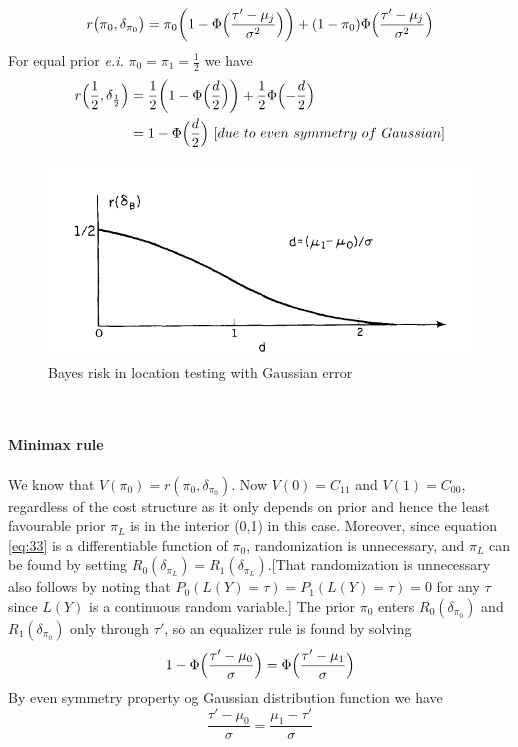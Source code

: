 \documentclass[a4paper,english,12pt]{article}
\begin{document}
\begin{exmp}
\begin{equation}
r\bigl(\pi_0,\delta_{\pi_{0}}\bigr)=\pi_0\biggl(1-\Phi\Bigl(\frac{\tau'-\mu_j}{\sigma^2}\Bigr)\biggr)+(1-\pi_0)\Phi\Bigl(\frac{\tau'-\mu_j}{\sigma^2}\Bigr)\label{eq:33}
\end{equation}
For equal prior \textit{e.i.} $\pi_0=\pi_1=\frac{1}{2}$ we have
\begin{align}
r\Bigl(\frac{1}{2},\delta_{\frac{1}{2}}\Bigr)&=\frac{1}{2}\biggl(1-\Phi\Bigl(\frac{d}{2}\Bigr)\biggr)+
												\frac{1}{2}\Phi\Bigl(-\frac{d}{2}\Bigr)\nonumber\\
											& = 1-\Phi\Bigl(\frac{d}{2}\Bigr)~[due~to~even~symmetry~of~Gaussian]
\end{align}
\begin{figure}[h]
\centering
\includegraphics[width=0.6\linewidth]{Figures/Gauss_Bayes}
\caption{Bayes risk in location testing with Gaussian error}
\label{fig:bayeserror}
\end{figure}\\\\
\textbf{Minimax rule}\\\\
We know that $V(\pi_0)=r(\pi_0,\delta_{\pi_{0}})$. Now $V(0)=C_{11}$ and $V(1)=C_{00}$, regardless of the cost structure as it only depends on prior and hence the least favourable prior $\pi_{L}$ is in the interior (0,1) in this case. Moreover, since equation \ref{eq:33} is a differentiable function of $\pi_{0}$, randomization is unnecessary, and $\pi_{L}$ can be found by setting $R_{0}(\delta_{\pi_{L}})=R_{1}(\delta_{\pi_{L}})$.[That randomization is unnecessary also follows by noting that $P_{0}(L(Y)=\tau)=P_{1}(L(Y)=\tau)=0$ for any $\tau$ since $L(Y)$ is a continuous random variable.] The prior $\pi_{0}$ enters $R_{0}(\delta_{\pi_{0}})$ and $R_{1}(\delta_{\pi_{0}})$ only through $\tau'$, so an equalizer rule is found by solving
\begin{equation}
1-\Phi\Bigl(\frac{\tau'-\mu_0}{\sigma}\Bigr)=\Phi\Bigl(\frac{\tau'-\mu_1}{\sigma}\Bigr)
\end{equation}
By even symmetry property og Gaussian distribution function we have
\begin{equation}
\frac{\tau'-\mu_0}{\sigma}=\frac{\mu_1-\tau'}{\sigma}

\end{equation}
\end{exmp}
\end{document}

